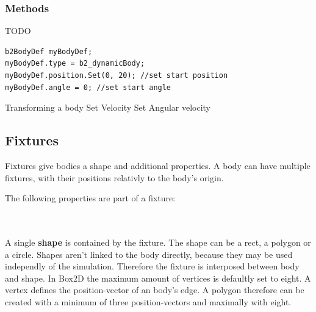 \documentclass[10pt,a4paper,DIV=11]{scrreprt}
\begin{document}
\subsubsection*{Methods}
TODO

\begin{lstlisting}[caption={Setting body definitions},label=lst:bodydef]
b2BodyDef myBodyDef;
myBodyDef.type = b2_dynamicBody;
myBodyDef.position.Set(0, 20); //set start position
myBodyDef.angle = 0; //set start angle
\end{lstlisting}


Transforming a body
Set Velocity
Set Angular velocity

\subsection{Fixtures}
Fixtures give bodies a shape and additional properties. A body can have multiple fixtures, with their positions relativly to the body's origin.

The following properties are part of a fixture:


   \\
\\

A single \textbf{shape} is contained by the fixture. The shape can be a rect, a polygon or a circle. Shapes aren't linked to the body directly, because they may be used independly of the simulation. Therefore the fixture is interposed between body and shape. In Box2D the maximum amount of vertices is defaultly set to eight. A vertex defines the position-vector of an body's edge. A polygon therefore can be created with a minimum of three position-vectors and maximally with eight.
\\
\end{document}
